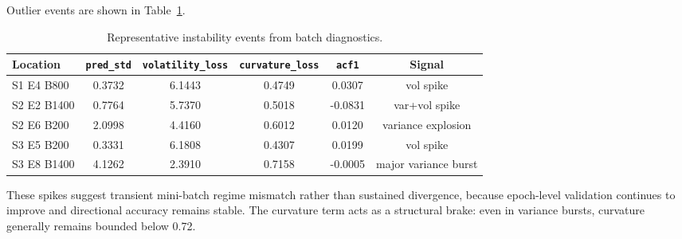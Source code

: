 \documentclass{article}
\begin{document}
Outlier events are shown in Table~\ref{tab:diag-spikes}.

\begin{table}[t]
\centering
\begin{tabular}{lccccc}
\toprule
Location & \texttt{pred\_std} & \texttt{volatility\_loss} & \texttt{curvature\_loss} & \texttt{acf1} & Signal \\
\midrule
S1 E4 B800 & 0.3732 & 6.1443 & 0.4749 & 0.0307 & vol spike \\
S2 E2 B1400 & 0.7764 & 5.7370 & 0.5018 & -0.0831 & var+vol spike \\
S2 E6 B200 & 2.0998 & 4.4160 & 0.6012 & 0.0120 & variance explosion \\
S3 E5 B200 & 0.3331 & 6.1808 & 0.4307 & 0.0199 & vol spike \\
S3 E8 B1400 & 4.1262 & 2.3910 & 0.7158 & -0.0005 & major variance burst \\
\bottomrule
\end{tabular}
\caption{Representative instability events from batch diagnostics.}
\label{tab:diag-spikes}
\end{table}

These spikes suggest transient mini-batch regime mismatch rather than sustained divergence, because epoch-level validation continues to improve and directional accuracy remains stable. The curvature term acts as a structural brake: even in variance bursts, curvature generally remains bounded below 0.72.
\end{document}
